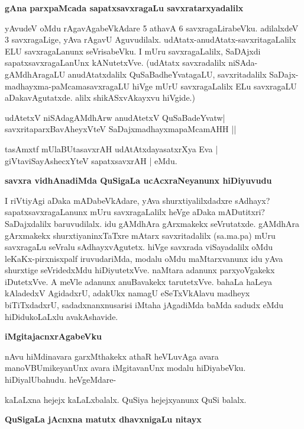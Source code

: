 {\bigskip
\noindent
{\large\bf gAna parxpaMcada sapatxsavxragaLu savxratarxyadalilx}}\label{page121}
\medskip

\noindent
yAvudeV oMdu rAgavAgabeVkAdare 5 athavA 6 savxragaLirabeVku. adilalxdeV 3 savxragaLige, yAva rAgavU Aguvudilalx. udAtatx-anudAtatx-savxritagaLalilx ELU savxragaLanunx seVrisabeVku. I mUru savxragaLalilx, SaDAjxdi sapatxsavxragaLanUnx kANutetxVve. (udAtatx savxradalilx niSAda-gAMdhAragaLU anudAtatxdalilx QuSaBadheYvatagaLU, savxritadalilx SaDajx-madhayxma-paMcamasavxragaLU hiVge mUrU savxragaLalilx ELu savxragaLU aDakavAgutatxde. alilx shikASxvAkayxvu hiVgide.)

\begin{shloka}
udAtetxV niSAdagAMdhArw anudAtetxV QuSaBadeYvatw|\\\label{122}
savxritaparxBavAheyxVteV SaDajxmadhayxmapaMcamAHH ||
\end{shloka}

\begin{shloka}
tasAmxtf mUlaBUtasavxrAH udAtAtxdayasatxrXya Eva |\\
giVtaviSayAshecxYteV sapatxsavxrAH | eMdu.
\end{shloka}

{\bigskip
\noindent
{\large\bf savxra vidhAnadiMda QuSigaLa ucAcxraNeyanunx hiDiyuvudu}}\label{page122}
\medskip

\noindent
I riVtiyAgi aDaka mADabeVkAdare, yAva shurxtiyalilxdadxre sAdhayx? sapatxsavxragaLanunx mUru savxragaLalilx heVge aDaka mADutitxri? SaDajxdalilx baruvudilalx. idu gAMdhAra gArxmakekx seVrutatxde. gAMdhAra gArxmakekx shurxtiyaninxTaTxre mAtarx savxritadalilx (sa.ma.pa) mUru savxragaLu seVralu sAdhayxvAgutetx. hiVge savxrada viSayadalilx oMdu leKaKx-pirxnisxpalf iruvudariMda, modalu oMdu maMtarxvanunx idu yAva shurxtige seVridedxMdu hiDiyutetxVve. naMtara adanunx parxyoVgakekx iDutetxVve. A meVle adanunx anuBavakekx tarutetxVve. bahaLa haLeya kAladedxV AgidadxrU, adakUkx namagU eSeTxVkAlavu madheyx biTiTxdadxrU, sadadxnanxnusarisi iMtaha jAgadiMda baMda sadudx eMdu hiDidukoLaLxlu avakAshavide.

{\medskip
\noindent
{\large\bf iMgitajacnxrAgabeVku}}\label{page122a}
\medskip

\noindent
nAvu hiMdinavara garxMthakekx athaR heVLuvAga avara manoVBUmikeyanUnx avara iMgitavanUnx modalu hiDiyabeVku. hiDiyalUbahudu. heVgeMdare- 

kaLaLxna hejejx kaLaLxbalalx. QuSiya hejejxyanunx QuSi balalx.

{\medskip
\noindent
{\large\bf QuSigaLa jAcnxna matutx dhavxnigaLu nitayx}}\label{page122b}
\medskip

